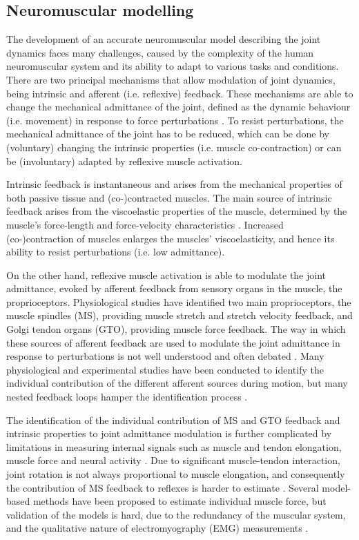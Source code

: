 \subsection*{Neuromuscular modelling}
The development of an accurate neuromuscular model describing the joint dynamics faces many challenges, caused by the complexity of the human neuromuscular system and its ability to adapt to various tasks and conditions. There are two principal mechanisms that allow modulation of joint dynamics, being intrinsic and afferent (i.e. reflexive) feedback. These mechanisms are able to change the mechanical admittance of the joint, defined as the dynamic behaviour (i.e. movement) in response to force perturbations \cite{schouten_nmclab_2008}. To resist perturbations, the mechanical admittance of the joint has to be reduced, which can be done by (voluntary) changing the intrinsic properties (i.e. muscle co-contraction) or can be (involuntary) adapted by reflexive muscle activation. 

Intrinsic feedback is instantaneous and arises from the mechanical properties of both passive tissue and (co-)contracted muscles. The main source of intrinsic feedback arises from the viscoelastic properties of the muscle, determined by the muscle’s force-length and force-velocity characteristics \cite{winter_biomechanics_1988}. Increased \mbox{(co-)contraction} of muscles enlarges the muscles' viscoelasticity, and hence its ability to resist perturbations (i.e. low admittance). 

On the other hand, reflexive muscle activation is able to modulate the joint admittance, evoked by afferent feedback from sensory organs in the muscle, the proprioceptors. Physiological studies have identified two main proprioceptors, the muscle spindles (MS), providing muscle stretch and stretch velocity feedback, and Golgi tendon organs (GTO), providing muscle force feedback. The way in which these sources of afferent feedback are used to modulate the joint admittance in response to perturbations is not well understood and often debated \cite{loeb_hard_1987}. Many physiological and experimental studies have been conducted to identify the individual contribution of the different afferent sources during motion, but many nested feedback loops hamper the identification process \cite{schouten_nmclab_2008}. 

The identification of the individual contribution of MS and GTO feedback and intrinsic properties to joint admittance modulation is further complicated by limitations in measuring internal signals such as muscle and tendon elongation, muscle force and neural activity \cite{allen_why_2016}. Due to significant muscle-tendon interaction, joint rotation is not always proportional to muscle elongation, and consequently the contribution of MS feedback to reflexes is harder to estimate \cite{zajac_muscle_1989}. Several model-based methods have been proposed to estimate individual muscle force, but validation of the models is hard, due to the redundancy of the muscular system, and the qualitative nature of electromyography (EMG) measurements \cite{erdemir_model-based_2007}. 

